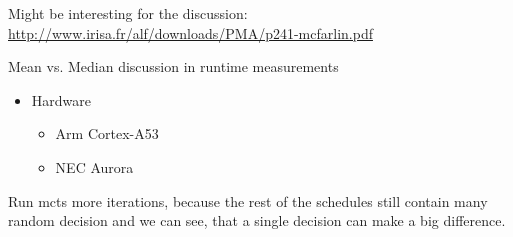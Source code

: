 Might be interesting for the discussion: \url{http://www.irisa.fr/alf/downloads/PMA/p241-mcfarlin.pdf}

Mean vs. Median discussion in runtime measurements

\begin{itemize}
    \item Hardware
    \begin{itemize}
        \item Arm Cortex-A53
        \item NEC Aurora
    \end{itemize}
\end{itemize}



Run \ac{mcts} more iterations, because the rest of the schedules still contain many random decision and we can see, that a single decision can make a big difference.
